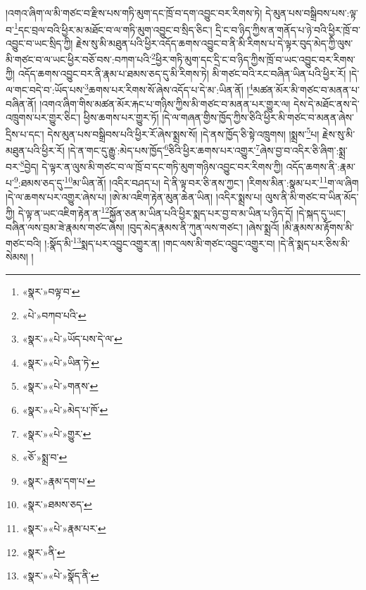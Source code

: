 །འགའ་ཞིག་ལ་མི་གཙང་བ་རྫིས་པས་གཏི་མུག་དང་ཁྲོ་བ་དག་འབྱུང་བར་རིགས་ཏེ། དེ་མུན་པས་བསྒྲིབས་པས་:ལྟ་བ་\footnote{«སྣར་»བལྟ་བ་}དང་བྲལ་བའི་ཕྱིར་མ་མཐོང་བ་ལ་གཏི་མུག་འབྱུང་བ་སྲིད་ཅིང་། དྲི་ང་བ་ཉིད་ཀྱིས་ན་གནོད་པ་ཉེ་བའི་ཕྱིར་ཁྲོ་བ་འབྱུང་བ་ཡང་སྲིད་ཀྱི། རྗེས་སུ་མི་མཐུན་པའི་ཕྱིར་འདོད་ཆགས་འབྱུང་བ་ནི་མི་རིགས་པ་དེ་ལྟར་བུད་མེད་ཀྱི་ལུས་མི་གཙང་བ་ལ་ཡང་ཕྱིར་བཅོ་བས་:བཀག་པའི་\footnote{«པེ་»བཀབ་པའི་}ཕྱིར་གཏི་མུག་དང་དྲི་ང་བ་ཉིད་ཀྱིས་ཁྲོ་བ་ཡང་འབྱུང་བར་རིགས་ཀྱི། འདོད་ཆགས་འབྱུང་བར་ནི་རྣམ་པ་ཐམས་ཅད་དུ་མི་རིགས་ཏེ། མི་གཙང་བའི་རང་བཞིན་ཡིན་པའི་ཕྱིར་རོ། །དེ་ལ་གང་བདེ་བ་:ཡོད་པས་\footnote{«སྣར་»«པེ་»ཡོད་པས་དེ་ལ་}ཆགས་པར་རིགས་སོ་ཞེས་འདོད་པ་དེ་མ་:ཡིན་ནོ། །\footnote{«སྣར་»«པེ་»ཡིན་ཏེ་}མཚན་མོར་མི་གཙང་བ་མནན་པ་བཞིན་ནོ། །འགའ་ཞིག་གིས་མཚན་མོར་རྐང་པ་གཉིས་ཀྱིས་མི་གཙང་བ་མནན་པར་གྱུར་ལ། དེས་དེ་མཐོང་ནས་དེ་འཁྲུགས་པར་གྱུར་ཅིང་། ཕྱིས་ཆགས་པར་གྱུར་ཏོ། །དེ་ལ་གཞན་གྱིས་ཁྱོད་ཀྱིས་ཅིའི་ཕྱིར་མི་གཙང་བ་མནན་ཞེས་དྲིས་པ་དང་། དེས་མུན་པས་བསྒྲིབས་པའི་ཕྱིར་རོ་ཞེས་སྨྲས་སོ། །དེ་ནས་ཁྱོད་ཅི་སྟེ་འཁྲུགས། །སྨྲས་\footnote{«སྣར་»«པེ་»གནས་}པ། རྗེས་སུ་མི་མཐུན་པའི་ཕྱིར་རོ། །དེ་ན་གང་དུ་རྒྱུ་:མེད་པས་ཁྱོད་\footnote{«སྣར་»«པེ་»མེད་པ་ཁོ་}ཅིའི་ཕྱིར་ཆགས་པར་འགྱུར་\footnote{«སྣར་»«པེ་»གྱུར་}ཞེས་བྱ་བ་འདིར་ཅི་ཞིག་:སྨྲ་བར་\footnote{«ཅོ་»སྨྲ་བ་}བྱེད། དེ་ལྟར་ན་ལུས་མི་གཙང་བ་ལ་ཁྲོ་བ་དང་གཏི་མུག་གཉིས་འབྱུང་བར་རིགས་ཀྱི། འདོད་ཆགས་ནི་:རྣམ་པ་\footnote{«སྣར་»རྣམ་དག་པ་}:ཐམས་ཅད་དུ་\footnote{«སྣར་»ཐམས་ཅད་}མ་ཡིན་ནོ། །འདིར་བཤད་པ། དེ་ནི་ལྟ་བར་ཅི་ནས་ཀྱང་། །རིགས་མིན་:སྣམ་པར་\footnote{«སྣར་»«པེ་»རྣམ་པར་}ག་ལ་ཞིག །དེ་ལ་ཆགས་པར་འགྱུར་ཞེས་པ། །ཨེ་མ་འཇིག་རྟེན་མུན་ཆེན་ཡིན། །འདིར་སྨྲས་པ། ལུས་ནི་མི་གཙང་བ་ཡིན་མོད་ཀྱི། དེ་ལྟ་ན་ཡང་འཇིག་རྟེན་ན་\footnote{«སྣར་»ནི་}སྐྱོན་ཅན་མ་ཡིན་པའི་ཕྱིར་སྨད་པར་བྱ་བ་མ་ཡིན་པ་ཉིད་དོ། །དེ་སྐད་དུ་ཡང་། བཞིན་ལས་བྲམ་ཟེ་རྣམས་གཙང་ཞེས། །བུད་མེད་རྣམས་ནི་ཀུན་ལས་གཙང་། །ཞེས་སྨྲའོ། །མི་རྣམས་མ་རྟོགས་མི་གཙང་བའི། །:སྣོད་མི་\footnote{«སྣར་»«པེ་»སྣོད་ནི་}སྨད་པར་འབྱུང་འགྱུར་ན། །གང་ལས་མི་གཙང་འབྱུང་འགྱུར་བ། །དེ་ནི་སྨད་པར་ཅིས་མི་སེམས། །
